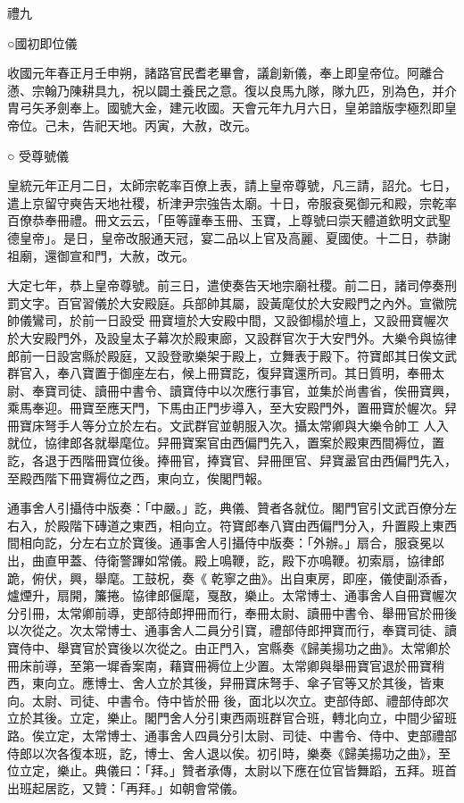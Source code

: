 
\begin{pinyinscope}

 禮九



 ○國初即位儀



 收國元年春正月壬申朔，諸路官民耆老畢會，議創新儀，奉上即皇帝位。阿離合懣、宗翰乃陳耕具九，祝以闢土養民之意。復以良馬九隊，隊九匹，別為色，并介胄弓矢矛劍奉上。國號大金，建元收國。天會元年九月六日，皇弟諳版孛極烈即皇帝位。己未，告祀天地。丙寅，大赦，改元。



 ○
 受尊號儀



 皇統元年正月二日，太師宗乾率百僚上表，請上皇帝尊號，凡三請，詔允。七日，遣上京留守奭告天地社稷，析津尹宗強告太廟。十日，帝服袞冕御元和殿，宗乾率百僚恭奉冊禮。冊文云云，「臣等謹奉玉冊、玉寶，上尊號曰崇天體道欽明文武聖德皇帝」。是日，皇帝改服通天冠，宴二品以上官及高麗、夏國使。十二日，恭謝祖廟，還御宣和門，大赦，改元。



 大定七年，恭上皇帝尊號。前三日，遣使奏告天地宗廟社稷。前二日，諸司停奏刑罰文字。百官習儀於大安殿庭。兵部帥其屬，設黃麾仗於大安殿門之內外。宣徽院帥儀鸞司，於前一日設受
 冊寶壇於大安殿中間，又設御榻於壇上，又設冊寶幄次於大安殿門外，及設皇太子幕次於殿東廊，又設群官次于大安門外。大樂令與協律郎前一日設宮縣於殿庭，又設登歌樂架于殿上，立舞表于殿下。符寶郎其日俟文武群官入，奉八寶置于御座左右，候上冊寶訖，復舁寶還所司。其日質明，奉冊太尉、奉寶司徒、讀冊中書令、讀寶侍中以次應行事官，並集於尚書省，俟冊寶興，乘馬奉迎。冊寶至應天門，下馬由正門步導入，至大安殿門外，置冊寶於幄次。舁冊寶床弩手人等分立於左右。文武群官並朝服入次。攝太常卿與大樂令帥工
 人入就位，協律郎各就舉麾位。舁冊寶案官由西偏門先入，置案於殿東西間褥位，置訖，各退于西階冊寶位後。捧冊官，捧寶官、舁冊匣官、舁寶盝官由西偏門先入，至殿西階下冊寶褥位之西，東向立，俟閣門報。



 通事舍人引攝侍中版奏：「中嚴。」訖，典儀、贊者各就位。閣門官引文武百僚分左右入，於殿階下磚道之東西，相向立。符寶郎奉八寶由西偏門分入，升置殿上東西間相向訖，分左右立於寶後。通事舍人引攝侍中版奏：「外辦。」扇合，服袞冕以出，曲直甲蓋、侍衛警蹕如常儀。殿上鳴鞭，訖，殿下亦鳴鞭。初索扇，協律郎跪，俯伏，興，舉麾。工鼓柷，奏《
 乾寧之曲》。出自東房，即座，儀使副添香，爐煙升，扇開，簾捲。協律郎偃麾，戛敔，樂止。太常博士、通事舍人自冊寶幄次分引冊，太常卿前導，吏部待郎押冊而行，奉冊太尉、讀冊中書令、舉冊官於冊後以次從之。次太常博士、通事舍人二員分引寶，禮部侍郎押寶而行，奉寶司徒、讀寶侍中、舉寶官於寶後以次從之。由正門入，宮縣奏《歸美揚功之曲》。太常卿於冊床前導，至第一墀香案南，藉寶冊褥位上少置。太常卿與舉冊寶官退於冊寶稍西，東向立。應博士、舍人立於其後，舁冊寶床弩手、傘子官等又於其後，皆東向。太尉、司徒、中書令。侍中皆於冊
 後，面北以次立。吏部侍郎、禮部侍郎次立於其後。立定，樂止。閣門舍人分引東西兩班群官合班，轉北向立，中間少留班路。俟立定，太常博士、通事舍人四員分引太尉、司徒、中書令、侍中、吏部禮部侍郎以次各復本班，訖，博士、舍人退以俟。初引時，樂奏《歸美揚功之曲》，至位立定，樂止。典儀曰：「拜。」贊者承傳，太尉以下應在位官皆舞蹈，五拜。班首出班起居訖，又贊：「再拜。」如朝會常儀。




\end{pinyinscope}
